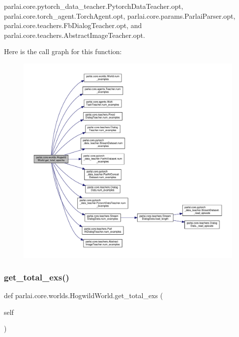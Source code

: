 parlai.\+core.\+pytorch\+\_\+data\+\_\+teacher.\+Pytorch\+Data\+Teacher.\+opt, parlai.\+core.\+torch\+\_\+agent.\+Torch\+Agent.\+opt, parlai.\+core.\+params.\+Parlai\+Parser.\+opt, parlai.\+core.\+teachers.\+Fb\+Dialog\+Teacher.\+opt, and parlai.\+core.\+teachers.\+Abstract\+Image\+Teacher.\+opt.

Here is the call graph for this function\+:
\nopagebreak
\begin{figure}[H]
\begin{center}
\leavevmode
\includegraphics[width=350pt]{classparlai_1_1core_1_1worlds_1_1HogwildWorld_a6bc364b91906b14d792957c8eeed5206_cgraph}
\end{center}
\end{figure}
\mbox{\label{classparlai_1_1core_1_1worlds_1_1HogwildWorld_a0e26cfad1c63628cb43f554c470426b9}} 
\subsubsection{\texorpdfstring{get\+\_\+total\+\_\+exs()}{get\_total\_exs()}}
{\footnotesize\ttfamily def parlai.\+core.\+worlds.\+Hogwild\+World.\+get\+\_\+total\+\_\+exs (\begin{DoxyParamCaption}\item[{}]{self }\end{DoxyParamCaption})}

